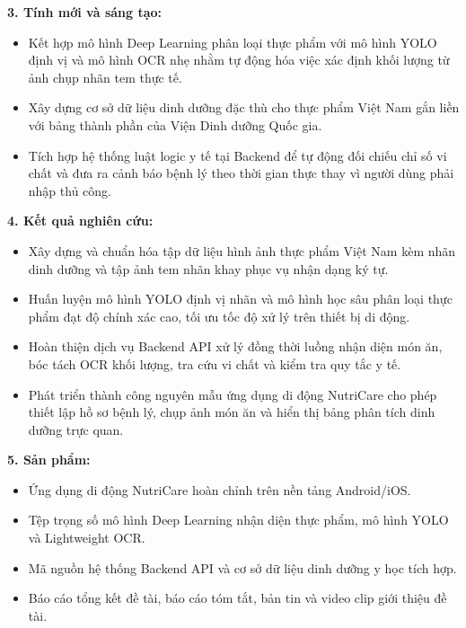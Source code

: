 \vspace{0.3cm}
\noindent\textbf{3. Tính mới và sáng tạo:}
\begin{itemize}[leftmargin=0.8cm, label=\textbullet, itemsep=2pt, topsep=2pt]
    \item Kết hợp mô hình Deep Learning phân loại thực phẩm với mô hình YOLO định vị và mô hình OCR nhẹ nhằm tự động hóa việc xác định khối lượng từ ảnh chụp nhãn tem thực tế.
    \item Xây dựng cơ sở dữ liệu dinh dưỡng đặc thù cho thực phẩm Việt Nam gắn liền với bảng thành phần của Viện Dinh dưỡng Quốc gia.
    \item Tích hợp hệ thống luật logic y tế tại Backend để tự động đối chiếu chỉ số vi chất và đưa ra cảnh báo bệnh lý theo thời gian thực thay vì người dùng phải nhập thủ công.
\end{itemize}

\vspace{0.3cm}
\noindent\textbf{4. Kết quả nghiên cứu:}
\begin{itemize}[leftmargin=0.8cm, label=\textbullet, itemsep=2pt, topsep=2pt]
    \item Xây dựng và chuẩn hóa tập dữ liệu hình ảnh thực phẩm Việt Nam kèm nhãn dinh dưỡng và tập ảnh tem nhãn khay phục vụ nhận dạng ký tự.
    \item Huấn luyện mô hình YOLO định vị nhãn và mô hình học sâu phân loại thực phẩm đạt độ chính xác cao, tối ưu tốc độ xử lý trên thiết bị di động.
    \item Hoàn thiện dịch vụ Backend API xử lý đồng thời luồng nhận diện món ăn, bóc tách OCR khối lượng, tra cứu vi chất và kiểm tra quy tắc y tế.
    \item Phát triển thành công nguyên mẫu ứng dụng di động NutriCare cho phép thiết lập hồ sơ bệnh lý, chụp ảnh món ăn và hiển thị bảng phân tích dinh dưỡng trực quan.
\end{itemize}

\vspace{0.3cm}
\noindent\textbf{5. Sản phẩm:}
\begin{itemize}[leftmargin=0.8cm, label=\textbullet, itemsep=2pt, topsep=2pt]
    \item Ứng dụng di động NutriCare hoàn chỉnh trên nền tảng Android/iOS.
    \item Tệp trọng số mô hình Deep Learning nhận diện thực phẩm, mô hình YOLO và Lightweight OCR.
    \item Mã nguồn hệ thống Backend API và cơ sở dữ liệu dinh dưỡng y học tích hợp.
    \item Báo cáo tổng kết đề tài, báo cáo tóm tắt, bản tin và video clip giới thiệu đề tài.
\end{itemize}

